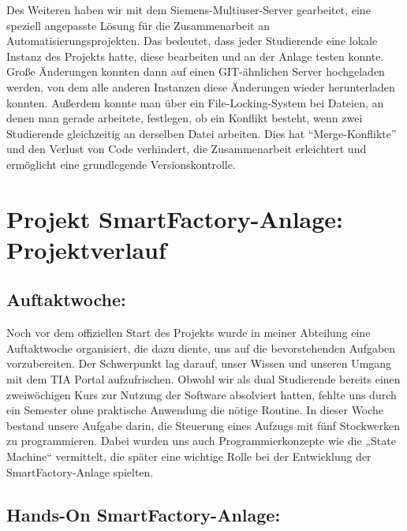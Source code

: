 Des Weiteren haben wir mit dem Siemens-Multiuser-Server gearbeitet, eine  speziell angepasste Lösung für die Zusammenarbeit an 
Automatisierungsprojekten. Das bedeutet, dass jeder Studierende eine lokale 
Instanz des Projekts hatte, diese bearbeiten und an der Anlage testen konnte. Große Änderungen konnten dann auf einen 
GIT-ähnlichen Server hochgeladen werden, von dem alle anderen Instanzen diese Änderungen wieder herunterladen konnten. 
Außerdem konnte man über ein File-Locking-System bei Dateien, an denen man gerade arbeitete, festlegen, ob ein Konflikt 
besteht, wenn zwei Studierende gleichzeitig an derselben Datei arbeiten. Dies hat ``Merge-Konflikte'' und den Verlust 
von Code verhindert, die Zusammenarbeit erleichtert und ermöglicht eine grundlegende Versionskontrolle.

\section{Projekt SmartFactory-Anlage: Projektverlauf}

\subsection{Auftaktwoche:}

Noch vor dem offiziellen Start des Projekts wurde in meiner Abteilung eine Auftaktwoche organisiert, die dazu diente, 
uns auf die bevorstehenden Aufgaben vorzubereiten. Der Schwerpunkt lag darauf, unser Wissen und unseren Umgang mit dem 
TIA Portal aufzufrischen. Obwohl wir als dual Studierende bereits einen zweiwöchigen Kurs zur Nutzung der Software 
absolviert hatten, fehlte uns durch ein Semester ohne praktische Anwendung die nötige Routine. In dieser Woche bestand 
unsere Aufgabe darin, die Steuerung eines Aufzugs mit fünf Stockwerken zu programmieren. Dabei wurden uns auch 
Programmierkonzepte wie die „State Machine“ vermittelt, die später eine wichtige Rolle bei der Entwicklung der 
SmartFactory-Anlage spielten.

\subsection{Hands-On SmartFactory-Anlage:}

